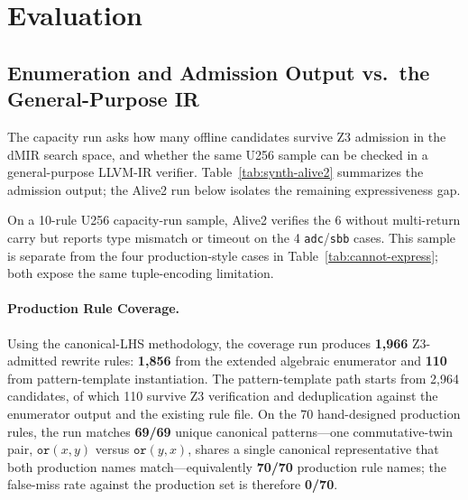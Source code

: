 \section{Evaluation}
\label{sec:evaluation}

\subsection{Enumeration and Admission Output vs.\ the General-Purpose IR}

The capacity run asks how many offline candidates survive Z3 admission
in the dMIR search space, and whether the same U256 sample can be
checked in a general-purpose LLVM-IR verifier. Table~\ref{tab:synth-alive2}
summarizes the admission output; the Alive2 run below isolates the
remaining expressiveness gap.



On a 10-rule U256 capacity-run sample, Alive2 verifies the 6 without
multi-return carry but reports type mismatch or timeout on the 4
\texttt{adc}/\texttt{sbb} cases. This sample is separate from the four
production-style cases in Table~\ref{tab:cannot-express}; both expose
the same tuple-encoding limitation.

\paragraph{Production Rule Coverage.} Using the canonical-LHS
methodology, the coverage run produces
\textbf{1{,}966} Z3-admitted rewrite rules: \textbf{1{,}856} from the
extended algebraic enumerator and \textbf{110} from pattern-template
instantiation. The pattern-template path starts from 2{,}964 candidates,
of which 110 survive Z3 verification and deduplication against the
enumerator output and the existing rule file. On the 70
hand-designed production rules, the run matches \textbf{69/69} unique
canonical patterns---one commutative-twin pair, $\texttt{or}(x,y)$
versus $\texttt{or}(y,x)$, shares a single canonical representative
that both production names match---equivalently \textbf{70/70}
production rule names; the false-miss rate against the production set
is therefore \textbf{0/70}.

